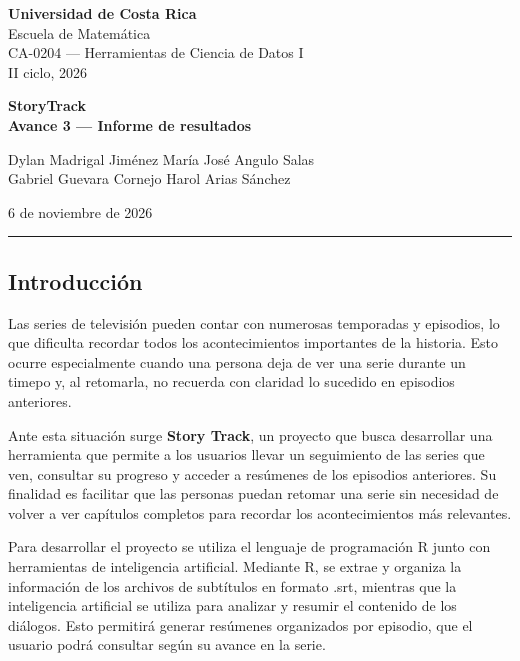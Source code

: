\documentclass[
  spanish,
  12pt,
  letterpaper,
]{article}
\author{}
\date{}
\begin{document}
\begin{flushleft}

{\small
\textbf{Universidad de Costa Rica}\\
Escuela de Matemática\\
CA-0204 — Herramientas de Ciencia de Datos I\\
II ciclo, 2026
}

\vspace{0.3cm}

{\Large\textbf{StoryTrack}}\\
\textbf{Avance 3 — Informe de resultados}

\vspace{0.25cm}

{\small
Dylan Madrigal Jiménez \quad María José Angulo Salas\\
Gabriel Guevara Cornejo \quad Harol Arias Sánchez
}

\vspace{0.15cm}

{\small 6 de noviembre de 2026}

\end{flushleft}

\noindent

\rule{\linewidth}{0.4pt}

\subsection{Introducción}\label{introducciuxf3n}

Las series de televisión pueden contar con numerosas temporadas y
episodios, lo que dificulta recordar todos los acontecimientos
importantes de la historia. Esto ocurre especialmente cuando una persona
deja de ver una serie durante un timepo y, al retomarla, no recuerda con
claridad lo sucedido en episodios anteriores.

Ante esta situación surge \textbf{Story Track}, un proyecto que busca
desarrollar una herramienta que permite a los usuarios llevar un
seguimiento de las series que ven, consultar su progreso y acceder a
resúmenes de los episodios anteriores. Su finalidad es facilitar que las
personas puedan retomar una serie sin necesidad de volver a ver
capítulos completos para recordar los acontecimientos más relevantes.

Para desarrollar el proyecto se utiliza el lenguaje de programación R
junto con herramientas de inteligencia artificial. Mediante R, se extrae
y organiza la información de los archivos de subtítulos en formato .srt,
mientras que la inteligencia artificial se utiliza para analizar y
resumir el contenido de los diálogos. Esto permitirá generar resúmenes
organizados por episodio, que el usuario podrá consultar según su avance
en la serie.
\end{document}
